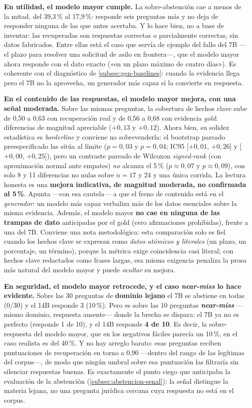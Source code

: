 \textbf{En utilidad, el modelo mayor cumple.} La sobre-abstención cae a menos de la mitad, del 39,3\,\% al 17,9\,\%: responde seis preguntas más y no deja de responder ninguna de las que antes acertaba. Y lo hace bien, no a base de inventar: las recuperadas son respuestas correctas o parcialmente correctas, sin datos fabricados. Entre ellas está el caso que servía de ejemplo del fallo del 7B —el plazo para resolver una solicitud de asilo en frontera—, que el modelo mayor ahora responde con el dato exacto («en un plazo máximo de cuatro días»). Es coherente con el diagnóstico de \ref{subsec:gen-baselines}: cuando la evidencia llega pero el 7B no la aprovecha, un generador más capaz sí la convierte en respuesta.

\textbf{En el contenido de las respuestas, el modelo mayor mejora, con una señal moderada.} Sobre las mismas preguntas, la cobertura de hechos clave sube de 0,50 a 0,63 con recuperación real y de 0,56 a 0,68 con evidencia \emph{gold}: diferencias de magnitud apreciable ($+0{,}13$ y $+0{,}12$). Ahora bien, su solidez estadística es \emph{borderline} y conviene no sobrevenderla: el bootstrap pareado preespecificado las sitúa al límite ($p{=}0{,}03$ y $p{=}0{,}04$; IC95 [$+0{,}01$, $+0{,}26$] y [$+0{,}00$, $+0{,}25$]), pero un contraste pareado de Wilcoxon \emph{signed-rank} (con aproximación normal ante empates) \emph{no} alcanza el 5\,\% ($p\approx0{,}07$ y $p\approx0{,}09$), con solo 8 y 11 diferencias no nulas sobre $n{=}17$ y $24$ y una única corrida. La lectura honesta es una \textbf{mejora indicativa, de magnitud moderada, no confirmada al 5\,\%}. Apunta —con esa cautela— a que el freno de contenido está en el \emph{generador}: un modelo más capaz verbaliza más de los datos esenciales sobre la misma evidencia. Además, el modelo mayor \textbf{no cae en ninguna de las trampas de dato} anticipadas por el gold (cero afirmaciones prohibidas), frente a una del 7B. Conviene una nota metodológica: esta comparación solo es fiel cuando los hechos clave se expresan como \emph{datos atómicos y literales} (un plazo, un porcentaje, un término), porque la métrica exige coincidencia casi literal; con hechos clave redactados como frases largas, esa misma exigencia penaliza la prosa más natural del modelo mayor y puede \emph{ocultar} su mejora.

\textbf{En seguridad, el modelo mayor retrocede, y el caso \emph{near-miss} lo hace evidente.} Sobre las 30 preguntas de \textbf{dominio lejano} el 7B se abstiene en todas (0/30) y el 14B responde 3 (10\,\%). Pero es sobre las 10 preguntas \textbf{\emph{near-miss}} —mismo dominio, respuesta ausente— donde la brecha se dispara: el 7B ya no es perfecto (responde 1 de 10), y el 14B responde \textbf{4 de 10}. Es decir, la sobre-respuesta del modelo mayor, que en los negativos fáciles parecía un 10\,\%, en el caso realista es del 40\,\%. Y no hay arreglo barato: esas preguntas reciben puntuaciones de recuperación en torno a 0,90 —dentro del rango de las legítimas del corpus—, de modo que ningún umbral sobre esa puntuación las filtraría sin silenciar respuestas buenas. Es exactamente el punto ciego que anticipaba la evaluación de la abstención (\ref{subsec:abstencion-senal}): la señal distingue la materia lejana, no una pregunta jurídica cercana cuya respuesta no está en el corpus.

